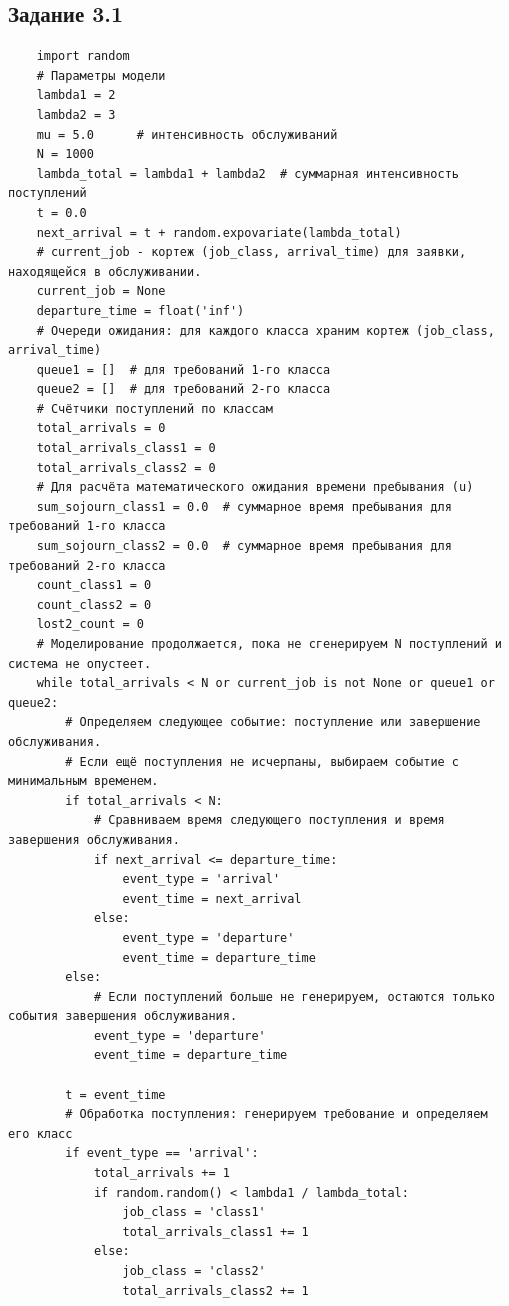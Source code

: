\documentclass[otchet]{SCWorks}
\begin{document}
\subsection{Задание 3.1}
\label{ap_task3_1}
\begin{verbatim}
    import random
    # Параметры модели
    lambda1 = 2     
    lambda2 = 3     
    mu = 5.0      # интенсивность обслуживаний
    N = 1000      
    lambda_total = lambda1 + lambda2  # суммарная интенсивность поступлений
    t = 0.0 
    next_arrival = t + random.expovariate(lambda_total)
    # current_job - кортеж (job_class, arrival_time) для заявки, находящейся в обслуживании.
    current_job = None
    departure_time = float('inf') 
    # Очереди ожидания: для каждого класса храним кортеж (job_class, arrival_time)
    queue1 = []  # для требований 1-го класса
    queue2 = []  # для требований 2-го класса
    # Счётчики поступлений по классам
    total_arrivals = 0
    total_arrivals_class1 = 0
    total_arrivals_class2 = 0
    # Для расчёта математического ожидания времени пребывания (u)
    sum_sojourn_class1 = 0.0  # суммарное время пребывания для требований 1-го класса
    sum_sojourn_class2 = 0.0  # суммарное время пребывания для требований 2-го класса
    count_class1 = 0         
    count_class2 = 0         
    lost2_count = 0
    # Моделирование продолжается, пока не сгенерируем N поступлений и система не опустеет.
    while total_arrivals < N or current_job is not None or queue1 or queue2:
        # Определяем следующее событие: поступление или завершение обслуживания.
        # Если ещё поступления не исчерпаны, выбираем событие с минимальным временем.
        if total_arrivals < N:
            # Сравниваем время следующего поступления и время завершения обслуживания.
            if next_arrival <= departure_time:
                event_type = 'arrival'
                event_time = next_arrival
            else:
                event_type = 'departure'
                event_time = departure_time
        else:
            # Если поступлений больше не генерируем, остаются только события завершения обслуживания.
            event_type = 'departure'
            event_time = departure_time
    
        t = event_time
        # Обработка поступления: генерируем требование и определяем его класс
        if event_type == 'arrival':    
            total_arrivals += 1
            if random.random() < lambda1 / lambda_total:
                job_class = 'class1'
                total_arrivals_class1 += 1
            else:
                job_class = 'class2'
                total_arrivals_class2 += 1
    

\end{verbatim}
\end{document}
